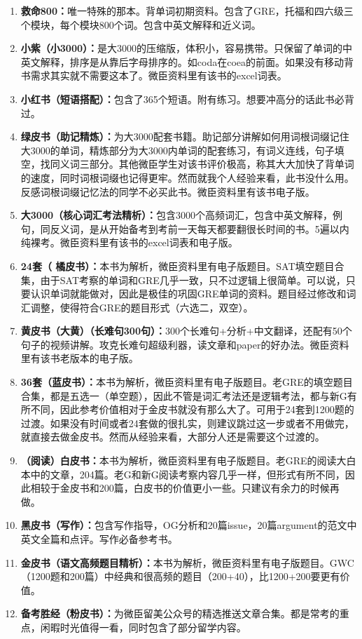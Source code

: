 \documentclass[cn,plain]{elegantbookex}
\begin{document}
\begin{enumerate}
    \item \textbf{救命800：}唯一特殊的那本。背单词初期资料。包含了GRE，托福和四六级三个模块，每个模块800个词。包含中英文解释和近义词。    
    \item \textbf{小紫（小3000）：}是大3000的压缩版，体积小，容易携带。只保留了单词的中英文解释，排序是从靠后字母排序的。如coda在coea的前面。如果没有移动背书需求其实就不需要这本了。微臣资料里有该书的excel词表。    
    \item \textbf{小红书（短语搭配）：}包含了365个短语。附有练习。想要冲高分的话此书必背过。    
    \item \textbf{绿皮书（助记精炼）：}为大3000配套书籍。助记部分讲解如何用词根词缀记住大3000的单词，精炼部分为大3000内单词的配套练习，有词义连线，句子填空，找同义词三部分。其他微臣学生对该书评价极高，称其大大加快了背单词的速度，同时词根词缀也记得更牢。然而就我个人经验来看，此书没什么用。反感词根词缀记忆法的同学不必买此书。微臣资料里有该书电子版。    
    \item \textbf{大3000（核心词汇考法精析）：}包含3000个高频词汇，包含中英文解释，例句，同反义词，是从开始备考到考前一天每天都要翻很长时间的书。5遍以内纯裸考。微臣资料里有该书的excel词表和电子版。    
    \item \textbf{24套（
    橘皮书）：}本书为解析，微臣资料里有电子版题目。SAT填空题目合集，由于SAT考察的单词和GRE几乎一致，只不过逻辑上很简单。可以说，只要认识单词就能做对，因此是极佳的巩固GRE单词的资料。题目经过修改和词汇调整，使得符合GRE的题目形式（六选二，双空）。    
    \item \textbf{黄皮书（大黄）（长难句300句）：}300个长难句+分析+中文翻译，还配有50个句子的视频讲解。攻克长难句超级利器，读文章和paper的好办法。微臣资料里有该书老版本的电子版。    
    \item \textbf{36套（蓝皮书）：}本书为解析，微臣资料里有电子版题目。老GRE的填空题目合集，都是五选一（单空题），因此不管是词汇考法还是逻辑考法，都与新G有所不同，因此参考价值相对于金皮书就没有那么大了。可用于24套到1200题的过渡。如果没有时间或者24套做的很扎实，则建议跳过这一步或者不用做完，就直接去做金皮书。然而从经验来看，大部分人还是需要这个过渡的。    
    \item \textbf{（阅读）白皮书：}本书为解析，微臣资料里有电子版题目。老GRE的阅读大白本中的文章，204篇。老G和新G阅读考察内容几乎一样，但形式有所不同，因此相较于金皮书和200篇，白皮书的价值更小一些。只建议有余力的时候再做。    
    \item \textbf{黑皮书（写作）：}包含写作指导，OG分析和20篇issue，20篇argument的范文中英文全篇和点评。写作必备参考书。    
    \item \textbf{金皮书（语文高频题目精析）：}本书为解析，微臣资料里有电子版题目。GWC（1200题和200篇）中经典和很高频的题目（200+40），比1200+200要更有价值。    
    \item \textbf{备考胜经（粉皮书）：}为微臣留美公众号的精选推送文章合集。都是常考的重点，闲暇时光值得一看，同时包含了部分留学内容。
\end{enumerate}
\end{document}
